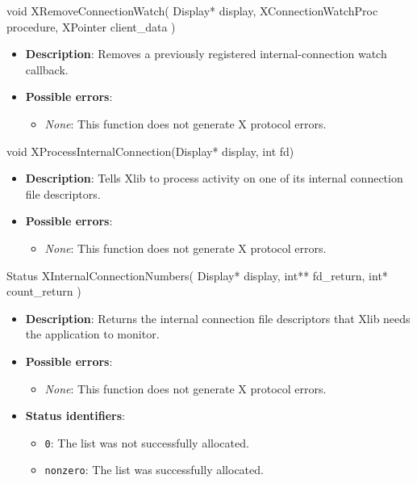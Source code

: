 \documentclass{report}
\begin{document}
\begin{itemize}
        \begin{cppcode}
            void XRemoveConnectionWatch(
                Display* display,
                XConnectionWatchProc procedure,
                XPointer client_data
            )
        \end{cppcode}
        \begin{itemize}
            \item \textbf{Description}: Removes a previously registered internal-connection watch callback.
            \item \textbf{Possible errors}:
                \begin{itemize}
                    \item \textit{None}: This function does not generate X protocol errors.
                \end{itemize}
        \end{itemize}

        \begin{cppcode}
            void XProcessInternalConnection(Display* display, int fd)
        \end{cppcode}
        \begin{itemize}
            \item \textbf{Description}: Tells Xlib to process activity on one of its internal connection file descriptors.
            \item \textbf{Possible errors}:
                \begin{itemize}
                    \item \textit{None}: This function does not generate X protocol errors.
                \end{itemize}
        \end{itemize}

        \begin{cppcode}
            Status XInternalConnectionNumbers(
                Display* display,
                int** fd_return,
                int* count_return
            )
        \end{cppcode}
        \begin{itemize}
            \item \textbf{Description}: Returns the internal connection file descriptors that Xlib needs the application to monitor.
            \item \textbf{Possible errors}:
                \begin{itemize}
                    \item \textit{None}: This function does not generate X protocol errors.
                \end{itemize}
            \item \textbf{Status identifiers}:
                \begin{itemize}
                    \item \texttt{0}: The list was not successfully allocated.
                    \item \texttt{nonzero}: The list was successfully allocated.
                \end{itemize}
        \end{itemize}


\end{itemize}
\end{document}
